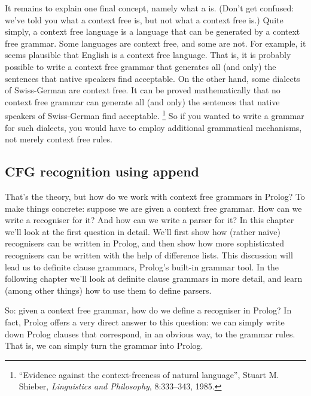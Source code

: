 \clearpage
It remains to explain one final concept, namely what a  is. (Don't get confused: we've told you what a context
free  is, but not what a context free
 is.)  Quite simply, a context free language is a
language that can be generated by a context free grammar. Some
languages are context free, and some are not. For example, it seems
plausible that English is a context free language. That is, it is
probably possible to write a context free grammar that generates all
(and only) the sentences that native speakers find acceptable. On the
other hand, some dialects of Swiss-German are  context
free. It can be proved mathematically that no context free grammar can
generate all (and only) the sentences that native speakers of
Swiss-German find acceptable.%
\footnote{``Evidence against the context-freeness of natural language'',
Stuart M. Shieber,
\textit{Linguistics and Philosophy}, 8:333--343, 1985.}
So if you wanted to write a grammar for
such dialects, you would have to employ additional grammatical
mechanisms, not merely context free rules.




\subsection*{CFG recognition using append}\label{SUBSEC.L7.NAIVE.IMPL}



That's the theory, but how do we work with context free grammars in
Prolog?  To make things concrete: suppose we are given a context free
grammar. How can we write a recogniser for it?  And how can we write a
parser for it? In this chapter we'll look at the first question in
detail.  We'll first show how (rather naive) recognisers can be
written in Prolog, and then show how more sophisticated recognisers
can be written with the help of difference lists.  This discussion
will lead us to definite clause grammars, Prolog's built-in grammar
tool.  In the following chapter we'll look at definite clause grammars
in more detail, and learn (among other things) how to use them to
define parsers.

So: given a context free grammar, how do we define a recogniser in
Prolog?  In fact, Prolog offers a very direct answer to this question:
we can simply write down Prolog clauses that correspond, in an obvious
way, to the grammar rules.  That is, we can simply turn the grammar
into Prolog.

